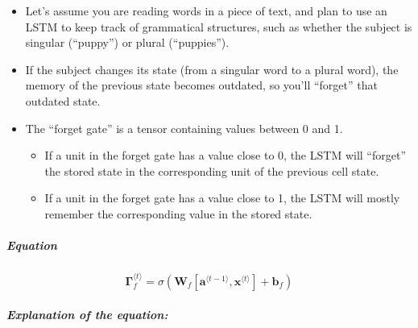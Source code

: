 \documentclass[11pt]{article}
\providecommand{\tightlist}{%
      \setlength{\itemsep}{0pt}\setlength{\parskip}{0pt}}
\begin{document}
\begin{itemize}
\tightlist
\item
  Let's assume you are reading words in a piece of text, and plan to use
  an LSTM to keep track of grammatical structures, such as whether the
  subject is singular (``puppy'') or plural (``puppies'').
\item
  If the subject changes its state (from a singular word to a plural
  word), the memory of the previous state becomes outdated, so you'll
  ``forget'' that outdated state.
\item
  The ``forget gate'' is a tensor containing values between 0 and 1.

  \begin{itemize}
  \tightlist
  \item
    If a unit in the forget gate has a value close to 0, the LSTM will
    ``forget'' the stored state in the corresponding unit of the
    previous cell state.
  \item
    If a unit in the forget gate has a value close to 1, the LSTM will
    mostly remember the corresponding value in the stored state.
  \end{itemize}
\end{itemize}

\hypertarget{equation}{%
\subparagraph{Equation}\label{equation}}

\[\mathbf{\Gamma}_f^{\langle t \rangle} = \sigma(\mathbf{W}_f[\mathbf{a}^{\langle t-1 \rangle}, \mathbf{x}^{\langle t \rangle}] + \mathbf{b}_f)\tag{1} \]

\hypertarget{explanation-of-the-equation}{%
\subparagraph{Explanation of the
equation:}\label{explanation-of-the-equation}}
\end{document}
